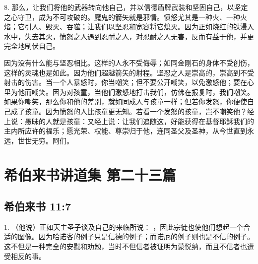 8. 那么，让我们将他的武器转向他自己，并以信德盾牌武装和坚固自己，以坚定之心守卫，成为不可攻破的。魔鬼的箭矢就是邪情。愤怒尤其是一种火、一种火焰；它引人、毁灭、吞噬；让我们以坚忍和宽容将它熄灭。因为正如烧红的铁浸入水中，失去其火，愤怒之人遇到忍耐之人，对忍耐之人无害，反而有益于他，并更完全地制伏自己。\par

因为没有什么能与坚忍相比。这样的人永不受侮辱；如同金刚石的身体不受创伤，这样的灵魂也是如此。因为他们超越箭矢的射程。坚忍之人是崇高的，崇高到不受射击的伤害。当一个人暴怒时，你当嘲笑；但不要公开嘲笑，以免激怒他；要在心里为他而嘲笑。因为对孩童，当他们激怒地打击我们，仿佛在报复时，我们嘲笑。如果你嘲笑，那么你和他的差别，就如同成人与孩童一样；但若你发怒，你便使自己成了孩童。因为愤怒的人比孩童更无知。若看一个发怒的孩童，岂不嘲笑他？经上说：愚昧的人就是孩童：又经上说：让我们追随这，好能获得在基督耶稣我们的主内所应许的福乐；愿光荣、权能、尊崇归于他，连同圣父及圣神，从今世直到永远，世世无穷。阿们。\par



\section{希伯来书讲道集 第二十三篇}


\subsection{希伯来书 11:7}

\par

1. （他说）正如天主圣子谈及自己的来临所说： ，因此宗徒也使他们想起一个合适的图像。因为哈诺客的例子只是信德的例子；而诺厄的例子则也是不信的例子。这不但是一种完全的安慰和劝勉，当时不但信者被证明为蒙悦纳，而且不信者也遭受相反的事。\par

